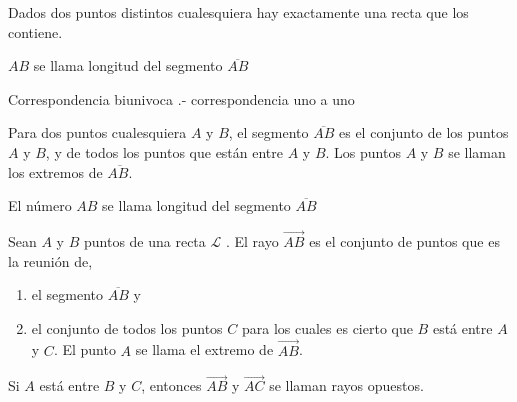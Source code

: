 \begin{tcolorbox}[colback=black!9!,colframe=white]
\begin{post}
Dados dos puntos distintos cualesquiera hay exactamente una recta que los contiene.
\begin{center}
$AB$ se llama longitud del segmento $\overline{AB}$\\
\end{center}
\end{post}
Correspondencia biunivoca .- correspondencia uno a uno
\end{tcolorbox}

\begin{tcolorbox}[colback=black!3!, colframe=white]
\begin{def.}
Para dos puntos cualesquiera $A$ y $B$, el segmento $\overline{AB}$ es el conjunto de los puntos $A$ y $B$, y de todos los puntos que están entre $A$ y $B.$ Los puntos $A$ y $B$ se llaman los extremos de $\overline{AB.}$
\end{def.}
\end{tcolorbox}

\begin{tcolorbox}[colback=black!3!, colframe=white]
\begin{def.}
El número $AB$ se llama longitud del segmento $\overline{AB}$
\end{def.}
\end{tcolorbox}

\begin{tcolorbox}[colback=black!3!, colframe=white]
\begin{def.}
Sean $A$ y $B$ puntos de una recta $\mathscr{L}$ . El rayo $\overrightarrow{AB}$ es el conjunto de puntos que es la reunión de,
\begin{enumerate}
\item el segmento $\overline{AB}$ y 
\item el conjunto de todos los puntos $C$ para los cuales es cierto que $B$ está entre $A$ y $C$.
 El punto $A$ se llama el extremo de $\overrightarrow{AB}$.
\end{enumerate}
\end{def.}
\end{tcolorbox}

\begin{tcolorbox}[colback=black!3!, colframe=white]
\begin{def.}
Si $A$ está entre $B$ y $C$, entonces $\overrightarrow{AB}$ y $\overrightarrow{AC}$ se llaman rayos opuestos.
\end{def.}
\end{tcolorbox}

